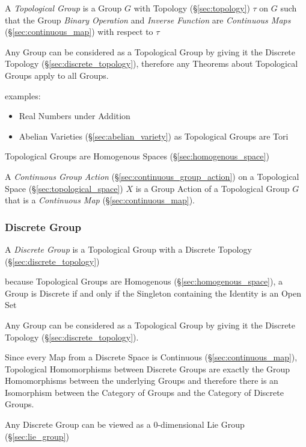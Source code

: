 A \emph{Topological Group} is a Group $G$ with Topology (\S\ref{sec:topology})
$\tau$ on $G$ such that the Group \emph{Binary Operation} and \emph{Inverse
  Function} are \emph{Continuous Maps} (\S\ref{sec:continuous_map})
with respect to $\tau$

Any Group can be considered as a Topological Group by giving it the Discrete
Topology (\S\ref{sec:discrete_topology}), therefore any Theorems about
Topological Groups apply to all Groups.

examples:
\begin{itemize}
  \item Real Numbers under Addition
  \item Abelian Varieties (\S\ref{sec:abelian_variety}) as Topological Groups
    are Tori %
\end{itemize}

Topological Groups are Homogenous Spaces (\S\ref{sec:homogenous_space})

A \emph{Continuous Group Action} (\S\ref{sec:continuous_group_action}) on a
Topological Space (\S\ref{sec:topological_space}) $X$ is a Group Action of a
Topological Group $G$ that is a \emph{Continuous Map}
(\S\ref{sec:continuous_map}).



\subsubsection{Discrete Group}\label{sec:discrete_group}

A \emph{Discrete Group} is a Topological Group with a Discrete Topology
(\S\ref{sec:discrete_topology})

because Topological Groups are Homogenous (\S\ref{sec:homogenous_space}), a
Group is Discrete if and only if the Singleton containing the Identity is an
Open Set

Any Group can be considered as a Topological Group by giving it the Discrete
Topology (\S\ref{sec:discrete_topology}).

Since every Map from a Discrete Space is Continuous
(\S\ref{sec:continuous_map}), Topological Homomorphisms between Discrete Groups
are exactly the Group Homomorphisms between the underlying Groups and therefore
there is an Isomorphism between the Category of Groups and the Category of
Discrete Groups.

Any Discrete Group can be viewed as a $0$-dimensional Lie Group
(\S\ref{sec:lie_group}) %

